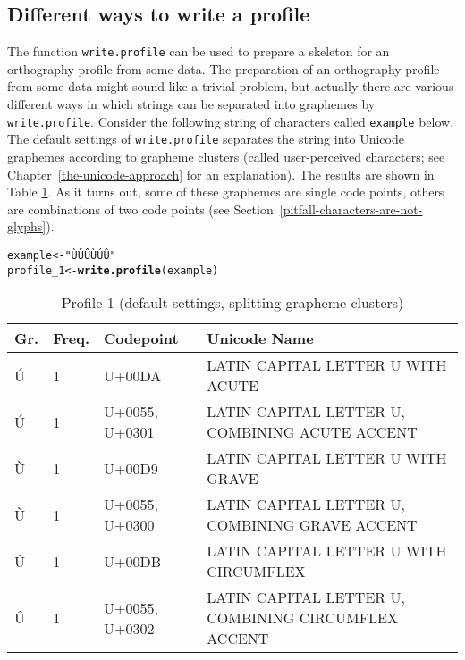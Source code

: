 \documentclass[output=inprep,
		biblatex
		]{LSP/langsci}\usepackage[]{graphicx}\usepackage[]{color}
\makeatletter
\newcommand{\hlstr}[1]{\textcolor[rgb]{0.192,0.494,0.8}{#1}}%
\newcommand{\hlstd}[1]{\textcolor[rgb]{0.345,0.345,0.345}{#1}}%
\newcommand{\hlkwb}[1]{\textcolor[rgb]{0.69,0.353,0.396}{#1}}%
\newcommand{\hlkwd}[1]{\textcolor[rgb]{0.737,0.353,0.396}{\textbf{#1}}}%
\newenvironment{kframe}{%
 \def\at@end@of@kframe{}%
 \ifinner\ifhmode%
  \def\at@end@of@kframe{\end{minipage}}%
  \begin{minipage}{\columnwidth}%
 \fi\fi%
 \def\FrameCommand##1{\hskip\@totalleftmargin \hskip-\fboxsep
 \colorbox{shadecolor}{##1}\hskip-\fboxsep
     \hskip-\linewidth \hskip-\@totalleftmargin \hskip\columnwidth}%
 \MakeFramed {\advance\hsize-\width
   \@totalleftmargin\z@ \linewidth\hsize
   \@setminipage}}%
 {\par\unskip\endMakeFramed%
 \at@end@of@kframe}
\newenvironment{knitrout}{}{} %
\makeatother
\begin{document}
\subsection*{Different ways to write a profile}
\label{write-profile}

The function \texttt{write.profile} can be used to prepare a skeleton for an
orthography profile from some data. The preparation of an orthography profile
from some data might sound like a trivial problem, but actually there are
various different ways in which strings can be separated into graphemes by
\texttt{write.profile}. Consider the following string of characters called
\texttt{example} below. The default settings of \texttt{write.profile} separates
the string into Unicode graphemes according to grapheme clusters (called user-perceived characters; see Chapter~\ref{the-unicode-approach} for an explanation). The results are shown 
in Table \ref {tab:profile1}. As it 
turns out, some of these graphemes are single code points, others are combinations
of two code points (see Section~\ref{pitfall-characters-are-not-glyphs}).

\begin{knitrout}\footnotesize
{}\color{fgcolor}\begin{kframe}
\begin{alltt}
\hlstd{example} \hlkwb{<-} \hlstr{"ÙÚÛÙÚÛ"}
\hlstd{profile_1} \hlkwb{<-} \hlkwd{write.profile}\hlstd{(example)}
\end{alltt}
\end{kframe}
\end{knitrout}

\begin{table}[H]
\centering
\begingroup\scriptsize
\begin{tabular}{llll}
  \toprule
Gr. & Freq. & Codepoint & Unicode Name \\ 
  \midrule
Ú & 1 & U+00DA & LATIN CAPITAL LETTER U WITH ACUTE \\ 
  Ú & 1 & U+0055, U+0301 & LATIN CAPITAL LETTER U, COMBINING ACUTE ACCENT \\ 
  Ù & 1 & U+00D9 & LATIN CAPITAL LETTER U WITH GRAVE \\ 
  Ù & 1 & U+0055, U+0300 & LATIN CAPITAL LETTER U, COMBINING GRAVE ACCENT \\ 
  Û & 1 & U+00DB & LATIN CAPITAL LETTER U WITH CIRCUMFLEX \\ 
  Û & 1 & U+0055, U+0302 & LATIN CAPITAL LETTER U, COMBINING CIRCUMFLEX ACCENT \\ 
   \bottomrule
\end{tabular}
\endgroup
\caption{Profile 1 (default settings, splitting grapheme clusters)} 
\label{tab:profile1}
\end{table}
\end{document}
